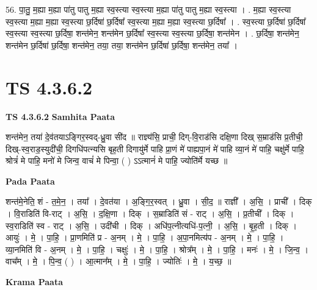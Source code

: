 \documentclass[17pt]{extarticle}
\begin{document}
56. पा॒तु॒ म॒ह्या म॒ह्या पा॑तु पातु म॒ह्या स्व॒स्त्या स्व॒स्त्या म॒ह्या पा॑तु पातु म॒ह्या स्व॒स्त्या । . म॒ह्या स्व॒स्त्या स्व॒स्त्या म॒ह्या म॒ह्या स्व॒स्त्या छ॒र्दिषा॑ छ॒र्दिषा᳚ स्व॒स्त्या म॒ह्या म॒ह्या स्व॒स्त्या छ॒र्दिषा᳚ । . स्व॒स्त्या छ॒र्दिषा॑ छ॒र्दिषा᳚ स्व॒स्त्या स्व॒स्त्या छ॒र्दिषा॒ शन्त॑मेन॒ शन्त॑मेन छ॒र्दिषा᳚ स्व॒स्त्या स्व॒स्त्या छ॒र्दिषा॒ शन्त॑मेन । . छ॒र्दिषा॒ शन्त॑मेन॒ शन्त॑मेन छ॒र्दिषा॑ छ॒र्दिषा॒ शन्त॑मेन॒ तया॒ तया॒ शन्त॑मेन छ॒र्दिषा॑ छ॒र्दिषा॒ शन्त॑मेन॒ तया᳚ । \newline
\pagebreak
{}

\section{ TS 4.3.6.2 }

\textbf{TS 4.3.6.2 } \newline
\textbf{Samhita Paata} \newline

शन्त॑मेन॒ तया॑ दे॒व॑तयाऽङ्गिर॒स्वद्-ध्रु॒वा सी॑द ॥ राज्ञ्य॑सि॒ प्राची॒ दिग्-वि॒राड॑सि दक्षि॒णा दिख् स॒म्राड॑सि प्र॒तीची॒ दिख्-स्व॒राड॒स्युदी॑ची॒ दिगधि॑पत्न्यसि बृह॒ती दिगायु॑र्मे पाहि प्रा॒णं मे॑ पाह्यपा॒नं मे॑ पाहि व्या॒नं मे॑ पाहि॒ चक्षु॑र्मे पाहि॒ श्रोत्रं॑ मे पाहि॒ मनो॑ मे जिन्व॒ वाचं॑ मे पिन्वा॒ ( ) ऽऽत्मानं॑ मे पाहि॒ ज्योति॑र्मे यच्छ ॥ \newline

\textbf{Pada Paata} \newline

शन्त॑मे॒नेति॒ शं - त॒मे॒न॒ । तया᳚ । दे॒वत॑या । अ॒ङ्गि॒र॒स्वत् । ध्रु॒वा । सी॒द॒ ॥ राज्ञी᳚ । अ॒सि॒ । प्राची᳚ । दिक् । वि॒राडिति॑ वि-राट् । अ॒सि॒ । द॒क्षि॒णा । दिक् । स॒म्राडिति॑ सं - राट् । अ॒सि॒ । प्र॒तीची᳚ । दिक् । स्व॒राडिति॑ स्व - राट् । अ॒सि॒ । उदी॑ची । दिक् । अधि॑प॒त्नीत्यधि॑-प॒त्नी॒ । अ॒सि॒ । बृ॒ह॒ती । दिक् । आयुः॑ । मे॒ । पा॒हि॒ । प्रा॒णमिति॑ प्र - अ॒नम् । मे॒ । पा॒हि॒ । अ॒पा॒नमित्य॑प - अ॒नम् । मे॒ । पा॒हि॒ । व्या॒नमिति॑ वि - अ॒नम् । मे॒ । पा॒हि॒ । चक्षुः॑ । मे॒ । पा॒हि॒ । श्रोत्र᳚म् । मे॒ । पा॒हि॒ । मनः॑ । मे॒ । जि॒न्व॒ । वाच᳚म् । मे॒ । पि॒न्व॒ ( ) । आ॒त्मान᳚म् । मे॒ । पा॒हि॒ । ज्योतिः॑ । मे॒ । य॒च्छ॒ ॥  \newline


\textbf{Krama Paata} \newline
\end{document}
